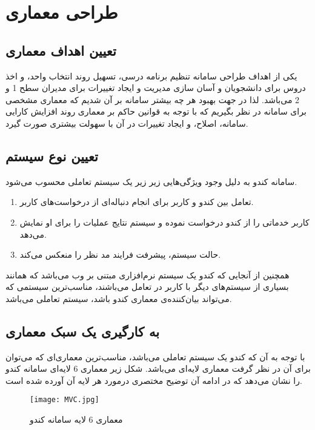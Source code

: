\documentclass{report}
\begin{document}
\clearpage
\chapter{طراحی معماری}
\section{تعیین اهداف معماری}
یکی از اهداف طراحی سامانه تنظیم برنامه درسی، تسهیل روند انتخاب واحد، و اخذ دروس برای دانشجویان و
آسان سازی مدیریت و ایجاد تغییرات برای مدیران سطح 1 و 2 می‌باشد. لذا در جهت بهبود هر چه بیشتر
سامانه بر آن شدیم که معماری مشخصی برای سامانه در نظر بگیریم که با توجه به قوانین حاکم بر معماری
روند افزایش کارایی سامانه، اصلاح، و ایجاد تغییرات در آن با سهولت بیشتری صورت گیرد.

\section{تعیین نوع سیستم}
سامانه کندو به دلیل وجود ویژگی‌هایی زیر زیر یک سیستم تعاملی محسوب می‌شود.

\begin{enumerate}
\item
تعامل بین کندو و کاربر برای انجام دنباله‌ای از درخواست‌های کاربر.
\item
کاربر خدماتی را از کندو درخواست نموده و سیستم نتایج عملیات را برای او نمایش می‌دهد.
\item
حالت سیستم، پیشرفت فرایند مد نظر را منعکس می‌کند.
\end{enumerate}

همچنین از آنجایی که کندو یک سیستم نرم‌افزاری مبتنی بر وب می‌باشد که همانند بسیاری از سیستم‌های دیگر با کاربر در تعامل می‌باشند، مناسب‌ترین سیستمی که می‌تواند بیان‌کننده‌ی معماری کندو باشد، سیستم تعاملی می‌باشد.

\section{به‌ کارگیری یک سبک معماری}
با توجه به آن که کندو یک سیستم تعاملی می‌باشد، مناسب‌ترین معماری‌ای که می‌توان برای آن در نظر گرفت معماری لایه‌ای می‌باشد.
شکل زیر معماری 6 لایه‌ای سامانه کندو را نشان می‌دهد که در ادامه آن توضیح مختصری درمورد هر لایه آن آورده شده است.

\begin{figure}[h!]
  \texttt{[image: MVC.jpg]}
  \caption{معماری 6 لایه سامانه کندو}
  \label{fig:1}
\end{figure}
\end{document}
